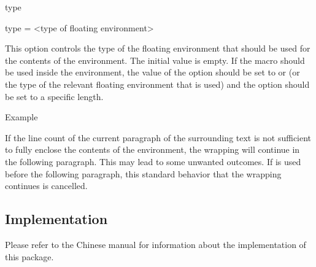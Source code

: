 \documentclass{ctxdoc}
\begin{document}
\begin{documentation}
 \begin{function}{type}
   \begin{syntax}
     type = <type of floating environment>
   \end{syntax}
   This option controls the type of the floating environment that should be used for the contents of the  environment. The initial value is empty.
   If the  macro should be used inside the  environment,
   the value of the  option should be set to  or  (or the type of the relevant floating environment that is used) and the  option should be set to a specific length.
   \begin{SideBySideExample}[xrightmargin=\dimeval{18em+5mm}]
     \begin{wrapstuff}[type=figure,width=5em]
       \centering
       \caption{Example}
     \end{wrapstuff}
     \QIANZIWEN
   \end{SideBySideExample}
 \end{function}

 \begin{function}{\wrapstuffclear}
   If the line count of the current paragraph of the surrounding text is not sufficient to fully enclose the contents of the  environment, the wrapping will continue in the following paragraph.
   This may lead to some unwanted outcomes. If  is used before the following paragraph, this standard behavior that the wrapping continues is cancelled.
 \end{function}

 \end{documentation}


 \begin{implementation}

  \section{Implementation}

  Please refer to the Chinese manual for information about the implementation of this package.

  \end{implementation}
\end{document}
